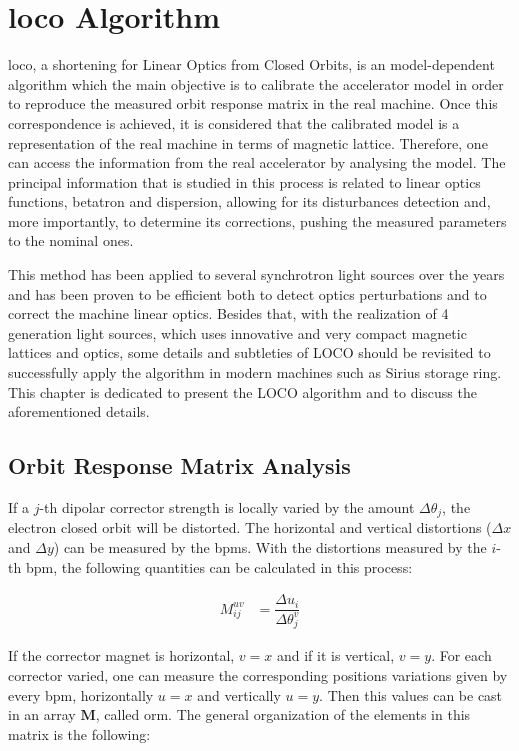 \chapter{\gls{loco} Algorithm}

\gls{loco}, a shortening for Linear Optics from Closed Orbits, is an model-dependent algorithm which the main objective is to calibrate the accelerator model in order to reproduce the measured orbit response matrix in the real machine. Once this correspondence is achieved, it is considered that the calibrated model is a representation of the real machine in terms of magnetic lattice. Therefore, one can access the information from the real accelerator by analysing the model. The principal information that is studied in this process is related to linear optics functions, betatron and dispersion, allowing for its disturbances detection and, more importantly, to determine its corrections, pushing the measured parameters to the nominal ones.

This method has been applied to several synchrotron light sources over the years and has been proven to be efficient both to detect optics perturbations and to correct the machine linear optics. Besides that, with the realization of 4 generation light sources, which uses innovative and very compact magnetic lattices and optics, some details and subtleties of LOCO should be revisited to successfully apply the algorithm in modern machines such as Sirius storage ring. This chapter is dedicated to present the LOCO algorithm and to discuss the aforementioned details.

\section{Orbit Response Matrix Analysis}

If a $j$-th dipolar corrector strength is locally varied by the amount $\Delta \theta_j$, the electron closed orbit will be distorted. The horizontal and vertical distortions ($\Delta x$ and $\Delta y$) can be measured by the \gls{bpm}s. With the distortions measured by the $i$-th \gls{bpm}, the following quantities can be calculated in this process:

\begin{align}
    M^{uv}_{ij} &= \dfrac{\Delta u_i}{\Delta \theta_j^v}
\end{align}

If the corrector magnet is horizontal, $v=x$ and if it is vertical, $v=y$. For each corrector varied, one can measure the corresponding positions variations given by every \gls{bpm}, horizontally $u=x$ and vertically $u=y$. Then this values can be cast in an array $\mathbf{M}$, called \gls{orm}. The general organization of the elements in this matrix is the following:

